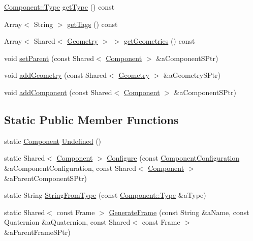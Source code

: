 \begin{DoxyCompactItemize}
\item 
\hyperlink{classostk_1_1simulation_1_1_component_a1d2ded63a8ab0bd81e27f25921be1e20}{Component\+::\+Type} \hyperlink{classostk_1_1simulation_1_1_component_a93375352059595b81e81569e445d4512}{get\+Type} () const
\item 
Array$<$ String $>$ \hyperlink{classostk_1_1simulation_1_1_component_ab792e508c303ec679ea8b8cbcc2c4c8f}{get\+Tags} () const
\item 
Array$<$ Shared$<$ \hyperlink{classostk_1_1simulation_1_1component_1_1_geometry}{Geometry} $>$ $>$ \hyperlink{classostk_1_1simulation_1_1_component_aba0796b346cbd27323c2e5c1df8ffcf2}{get\+Geometries} () const
\item 
void \hyperlink{classostk_1_1simulation_1_1_component_a266bf1a8b756f55ef24cc9fee3fd4fca}{set\+Parent} (const Shared$<$ \hyperlink{classostk_1_1simulation_1_1_component}{Component} $>$ \&a\+Component\+S\+Ptr)
\item 
void \hyperlink{classostk_1_1simulation_1_1_component_ad3ef491ef73a9e01507c95541790bdf2}{add\+Geometry} (const Shared$<$ \hyperlink{classostk_1_1simulation_1_1component_1_1_geometry}{Geometry} $>$ \&a\+Geometry\+S\+Ptr)
\item 
void \hyperlink{classostk_1_1simulation_1_1_component_aeb00ae625a59168bde62bcbb3e1d6ed6}{add\+Component} (const Shared$<$ \hyperlink{classostk_1_1simulation_1_1_component}{Component} $>$ \&a\+Component\+S\+Ptr)
\end{DoxyCompactItemize}
\subsection*{Static Public Member Functions}
\begin{DoxyCompactItemize}
\item 
static \hyperlink{classostk_1_1simulation_1_1_component}{Component} \hyperlink{classostk_1_1simulation_1_1_component_ad8849104db5f1e96a2de547bc1c11867}{Undefined} ()
\item 
static Shared$<$ \hyperlink{classostk_1_1simulation_1_1_component}{Component} $>$ \hyperlink{classostk_1_1simulation_1_1_component_a635e3685019800ec343ec8474954ff0e}{Configure} (const \hyperlink{structostk_1_1simulation_1_1_component_configuration}{Component\+Configuration} \&a\+Component\+Configuration, const Shared$<$ \hyperlink{classostk_1_1simulation_1_1_component}{Component} $>$ \&a\+Parent\+Component\+S\+Ptr)
\item 
static String \hyperlink{classostk_1_1simulation_1_1_component_a7f74a40eb3aae2f7e12af002ca9dbc89}{String\+From\+Type} (const \hyperlink{classostk_1_1simulation_1_1_component_a1d2ded63a8ab0bd81e27f25921be1e20}{Component\+::\+Type} \&a\+Type)
\item 
static Shared$<$ const Frame $>$ \hyperlink{classostk_1_1simulation_1_1_component_a9b5f84be02c06a7b6576fcdb00640ede}{Generate\+Frame} (const String \&a\+Name, const Quaternion \&a\+Quaternion, const Shared$<$ const Frame $>$ \&a\+Parent\+Frame\+S\+Ptr)
\end{DoxyCompactItemize}
